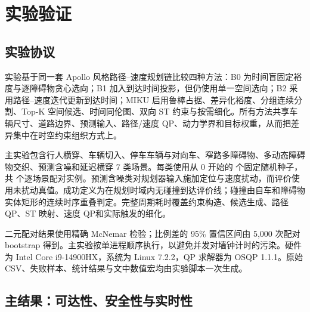 \section{实验验证}
\label{sec:experiment}

\subsection{实验协议}

实验基于同一套 Apollo 风格路径--速度规划链比较四种方法：B0 为时间盲固定裕度与逐障碍物贪心选向；B1 加入到达时间投影，但仍使用单一空间选向；B2 采用路径--速度迭代更新到达时间；MIKU 启用鲁棒占据、差异化裕度、分组连续分割、Top-K 空间候选、时间同伦图、双向 ST 约束与按需细化。所有方法共享车辆尺寸、道路边界、预测输入、路径/速度 QP、动力学界和目标权重，从而把差异集中在时空约束组织方式上。

主实验包含行人横穿、车辆切入、停车车辆与对向车、窄路多障碍物、多动态障碍物交织、预测含噪和延迟横穿 7 类场景。每类使用从 0 开始的 \RandSeedCount 个固定随机种子，共 \RandCaseCount 个逐场景配对实例。预测含噪类对规划器输入施加定位与速度扰动，而评价使用未扰动真值。成功定义为在规划时域内无碰撞到达评价线；碰撞由自车和障碍物实体矩形的连续时序重叠判定。完整周期耗时覆盖约束构造、候选生成、路径 QP、ST 映射、速度 QP和实际触发的细化。

二元配对结果使用精确 McNemar 检验；比例差的 95\% 置信区间由 5,000 次配对 bootstrap 得到。主实验按单进程顺序执行，以避免并发对墙钟计时的污染。硬件为 Intel Core i9-14900HX，系统为 Linux 7.2.2，QP 求解器为 OSQP 1.1.1\citep{stellato2020osqp}。原始 CSV、失败样本、统计结果与文中数值宏均由实验脚本一次生成。

\subsection{主结果：可达性、安全性与实时性}

